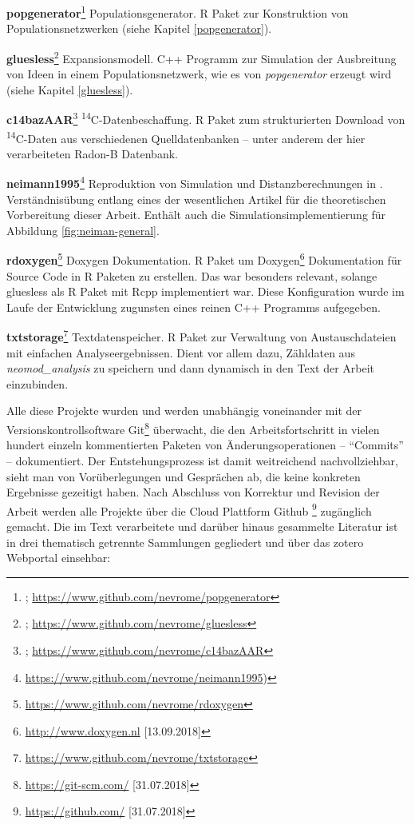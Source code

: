 \documentclass[openany,twoside,twocolumn]{book}
\let\rmarkdownfootnote\footnote%
\def\footnote{\protect\rmarkdownfootnote}
\begin{document}
\textbf{popgenerator}\footnote{\textcite{schmid_popgenerator_2018}; \url{https://www.github.com/nevrome/popgenerator}} \newline
Populationsgenerator. R Paket zur Konstruktion von Populationsnetzwerken (siehe Kapitel \ref{popgenerator}).

\textbf{gluesless}\footnote{\textcite{clemens_schmid_gluesless_2018}; \url{https://www.github.com/nevrome/gluesless}} \newline 
Expansionsmodell. C++ Programm zur Simulation der Ausbreitung von Ideen in einem Populationsnetzwerk, wie es von \emph{popgenerator} erzeugt wird (siehe Kapitel \ref{gluesless}).

\textbf{c14bazAAR}\footnote{\textcite{schmid_c14bazaar_2018}; \url{https://www.github.com/nevrome/c14bazAAR}} \newline 
\textsuperscript{14}C-Datenbeschaffung. R Paket zum strukturierten Download von \textsuperscript{14}C-Daten aus verschiedenen Quelldatenbanken -- unter anderem der hier verarbeiteten Radon-B Datenbank.

\textbf{neimann1995}\footnote{\url{https://www.github.com/nevrome/neimann1995})} \newline 
Reproduktion von Simulation und Distanzberechnungen in \textcite{neiman_stylistic_1995}. Verständnisübung entlang eines der wesentlichen Artikel für die theoretischen Vorbereitung dieser Arbeit. Enthält auch die Simulationsimplementierung für Abbildung \ref{fig:neiman-general}.

\textbf{rdoxygen}\footnote{\url{https://www.github.com/nevrome/rdoxygen}} \newline 
Doxygen Dokumentation. R Paket um Doxygen\footnote{\url{http://www.doxygen.nl} {[}13.09.2018{]}} Dokumentation für Source Code in R Paketen zu erstellen. Das war besonders relevant, solange gluesless als R Paket mit Rcpp implementiert war. Diese Konfiguration wurde im Laufe der Entwicklung zugunsten eines reinen C++ Programms aufgegeben.

\textbf{txtstorage}\footnote{\url{https://www.github.com/nevrome/txtstorage}} \newline 
Textdatenspeicher. R Paket zur Verwaltung von Austauschdateien mit einfachen Analyseergebnissen. Dient vor allem dazu, Zähldaten aus \emph{neomod\_analysis} zu speichern und dann dynamisch in den Text der Arbeit einzubinden.

Alle diese Projekte wurden und werden unabhängig voneinander mit der Versionskontrollsoftware Git\footnote{\url{https://git-scm.com/} {[}31.07.2018{]}} überwacht, die den Arbeitsfortschritt in vielen hundert einzeln kommentierten Paketen von Änderungsoperationen -- ``Commits'' -- dokumentiert. Der Entstehungsprozess ist damit weitreichend nachvollziehbar, sieht man von Vorüberlegungen und Gesprächen ab, die keine konkreten Ergebnisse gezeitigt haben. Nach Abschluss von Korrektur und Revision der Arbeit werden alle Projekte über die Cloud Plattform Github \footnote{\url{https://github.com/} {[}31.07.2018{]}} zugänglich gemacht. Die im Text verarbeitete und darüber hinaus gesammelte Literatur ist in drei thematisch getrennte Sammlungen gegliedert und über das zotero Webportal einsehbar:
\end{document}
